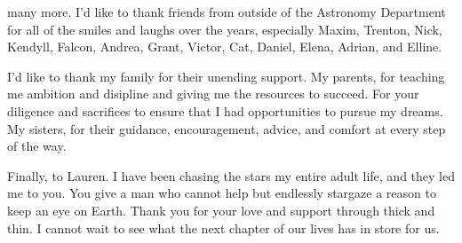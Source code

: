 \documentclass[main.tex]{subfiles}
\begin{document}
\begin{doublespace}
many more.
I'd like to thank friends from outside of the Astronomy Department for all of
the smiles and laughs over the years, especially Maxim, Trenton, Nick, Kendyll,
Falcon, Andrea, Grant, Victor, Cat, Daniel, Elena, Adrian, and Elline.
\par
I'd like to thank my family for their unending support.
My parents, for teaching me ambition and disipline and giving me the resources
to succeed.
For your diligence and sacrifices to ensure that I had opportunities to pursue
my dreams.
My sisters, for their guidance, encouragement, advice, and comfort at every
step of the way.
\par
Finally, to Lauren.
I have been chasing the stars my entire adult life, and they led me to you.
You give a man who cannot help but endlessly stargaze a reason to keep an
eye on Earth.
Thank you for your love and support through thick and thin.
I cannot wait to see what the next chapter of our lives has in store for us.















\end{doublespace}
\end{document}
